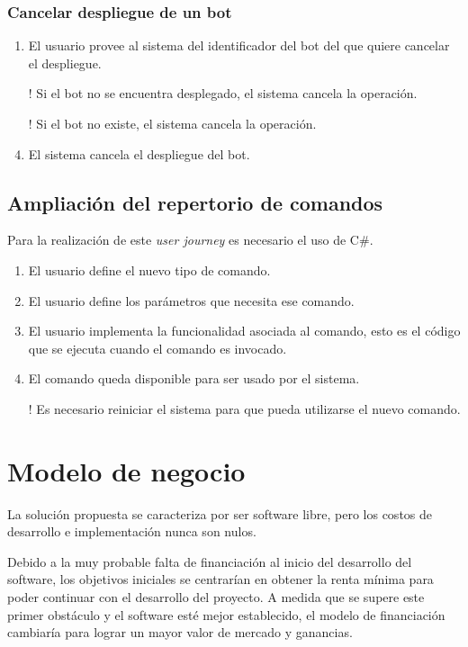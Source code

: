 \subsubsection{Cancelar despliegue de un bot}

\begin{enumerate}
	\item El usuario provee al sistema del identificador del bot del que quiere cancelar el despliegue.
	\item[!] Si el bot no se encuentra desplegado, el sistema cancela la operación.
	\item[!] Si el bot no existe, el sistema cancela la operación.
	\item El sistema cancela el despliegue del bot.
\end{enumerate}


\subsection{Ampliación del repertorio de comandos}

Para la realización de este \textit{user journey} es necesario el uso de C\#.

\begin{enumerate}
	\item El usuario define el nuevo tipo de comando.
	\item El usuario define los parámetros que necesita ese comando.
	\item El usuario implementa la funcionalidad asociada al comando, esto es el código que se ejecuta cuando el comando es invocado.
	\item El comando queda disponible para ser usado por el sistema.
	\item[!] Es necesario reiniciar el sistema para que pueda utilizarse el nuevo comando.
\end{enumerate}

\section{Modelo de negocio}

La solución propuesta se caracteriza por ser software libre, pero los costos de desarrollo e implementación nunca son nulos.

Debido a la muy probable falta de financiación al inicio del desarrollo del software, los objetivos iniciales se centrarían en obtener la renta mínima para poder continuar con el desarrollo del proyecto. A medida que se supere este primer obstáculo y el software esté mejor establecido, el modelo de financiación cambiaría para lograr un mayor valor de mercado y ganancias.

